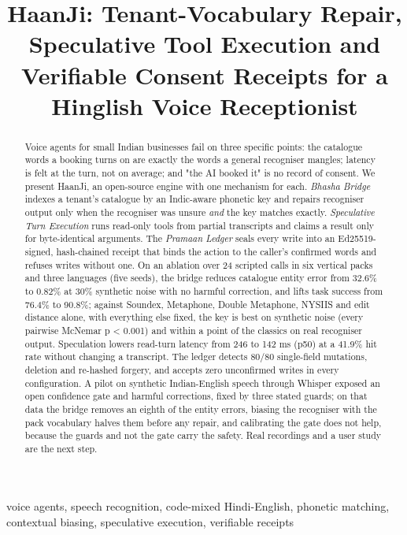 \documentclass[conference]{IEEEtran}
\title{HaanJi: Tenant-Vocabulary Repair, Speculative Tool Execution and Verifiable Consent Receipts for a Hinglish Voice Receptionist}
\author{\IEEEauthorblockN{Aritra Hazra}\IEEEauthorblockA{B.Tech IT (AI)} \and \IEEEauthorblockN{Prabhav Upadhyay}\IEEEauthorblockA{B.Tech IT (AI)} \and \IEEEauthorblockN{Anuj Uniyal}\IEEEauthorblockA{B.Tech IT (AI)}}
\begin{document}
\maketitle

\begin{abstract}
Voice agents for small Indian businesses fail on three specific points: the catalogue words a booking turns on are exactly the words a general recogniser mangles; latency is felt at the turn, not on average; and "the AI booked it" is no record of consent. We present HaanJi, an open-source engine with one mechanism for each. \emph{Bhasha Bridge} indexes a tenant's catalogue by an Indic-aware phonetic key and repairs recogniser output only when the recogniser was unsure \emph{and} the key matches exactly. \emph{Speculative Turn Execution} runs read-only tools from partial transcripts and claims a result only for byte-identical arguments. The \emph{Pramaan Ledger} seals every write into an Ed25519-signed, hash-chained receipt that binds the action to the caller's confirmed words and refuses writes without one. On an ablation over 24 scripted calls in six vertical packs and three languages (five seeds), the bridge reduces catalogue entity error from 32.6\% to 0.82\% at 30\% synthetic noise with no harmful correction, and lifts task success from 76.4\% to 90.8\%; against Soundex, Metaphone, Double Metaphone, NYSIIS and edit distance alone, with everything else fixed, the key is best on synthetic noise (every pairwise McNemar p < 0.001) and within a point of the classics on real recogniser output. Speculation lowers read-turn latency from 246 to 142 ms (p50) at a 41.9\% hit rate without changing a transcript. The ledger detects 80/80 single-field mutations, deletion and re-hashed forgery, and accepts zero unconfirmed writes in every configuration. A pilot on synthetic Indian-English speech through Whisper exposed an open confidence gate and harmful corrections, fixed by three stated guards; on that data the bridge removes an eighth of the entity errors, biasing the recogniser with the pack vocabulary halves them before any repair, and calibrating the gate does not help, because the guards and not the gate carry the safety. Real recordings and a user study are the next step.
\end{abstract}

\begin{IEEEkeywords}
voice agents, speech recognition, code-mixed Hindi-English, phonetic matching, contextual biasing, speculative execution, verifiable receipts
\end{IEEEkeywords}
\end{document}
